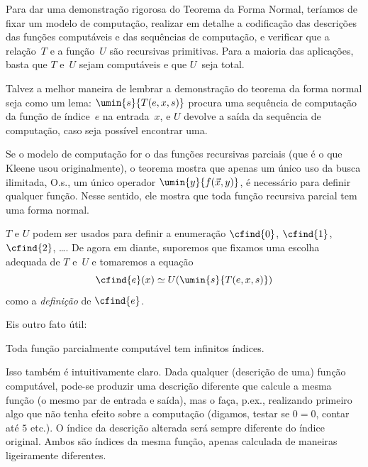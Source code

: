 \documentclass[../../../include/open-logic-section]{subfiles}
\begin{document}
\begin{explain}
Para dar uma demonstração rigorosa do Teorema da Forma Normal, teríamos
de fixar um modelo de computação, realizar em detalhe a codificação das
descrições das funções computáveis e das sequências de computação, e
verificar que a relação~$T$ e a função~$U$ são recursivas primitivas.
Para a maioria das aplicações, basta que $T$ e~$U$ sejam computáveis
e que $U$~seja total.

Talvez a melhor maneira de lembrar a demonstração do teorema da forma
normal seja como um lema: $\umin{s}{T(e, x, s)}$ procura uma sequência
de computação da função de índice~$e$ na entrada~$x$, e $U$ devolve a
saída da sequência de computação, caso seja possível encontrar uma.
\end{explain}

Se o modelo de computação for o das funções recursivas parciais (que é
o que Kleene usou originalmente), o teorema mostra que apenas um único
uso da busca ilimitada, O.s.\@, um único operador
$\umin{y}{f(\vec x, y)}$, é necessário para definir qualquer função.
Nesse sentido, ele mostra que toda função recursiva parcial tem uma
forma normal.

$T$ e $U$ podem ser usados para definir a enumeração $\cfind{0}$,
$\cfind{1}$, $\cfind{2}$, \dots. De agora em diante, suporemos que
fixamos uma escolha adequada de $T$ e~$U$ e tomaremos a equação
\[
\cfind{e}(x) \simeq U(\umin{s}{T(e,x,s)})
\]
como a \emph{definição} de $\cfind{e}$.

Eis outro fato útil:

\begin{thm}
Toda função parcialmente computável tem infinitos índices.
\end{thm}

Isso também é intuitivamente claro. Dada qualquer (descrição de uma)
função computável, pode-se produzir uma descrição diferente que calcule
a mesma função (o mesmo par de entrada e saída), mas o faça, p.ex., realizando primeiro algo que não tenha efeito sobre a
computação (digamos, testar se $0 = 0$, contar até $5$ etc.). O índice
da descrição alterada será sempre diferente do índice original. Ambos
são índices da mesma função, apenas calculada de maneiras ligeiramente
diferentes.
\end{document}
